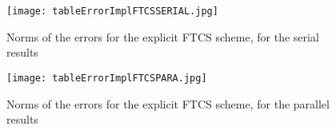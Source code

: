 \documentclass [10 pt, a4 paper]{report}
\begin{document}
\begin{figure}[!htbp]
\centering
\texttt{[image: tableErrorImplFTCSSERIAL.jpg]}
\caption{\label{fig:image} Norms of the errors for the explicit FTCS scheme, for the serial results}
\end{figure}

\begin{figure}[!htbp]
\centering
\texttt{[image: tableErrorImplFTCSPARA.jpg]}
\caption{\label{fig:image} Norms of the errors for the explicit FTCS scheme, for the parallel results}
\end{figure}
\end{document}
